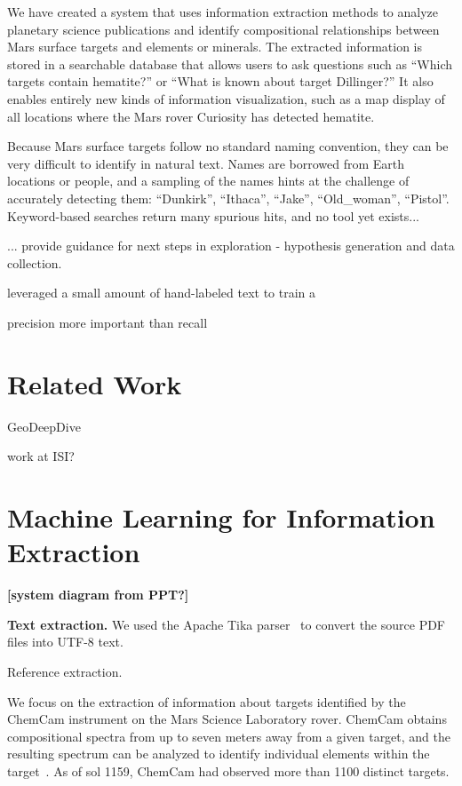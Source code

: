 \documentclass[letterpaper]{article} %
\begin{document}
We have created a system that uses information extraction methods to
analyze planetary science publications and identify compositional
relationships between Mars surface targets and elements or minerals.
The extracted information is stored in a searchable database that
allows users to ask questions such as ``Which targets contain
hematite?'' or ``What is known about target Dillinger?''  It also
enables entirely new kinds of information visualization, such as a map
display of all locations where the Mars rover Curiosity has detected
hematite. 

Because Mars surface targets follow no standard naming convention,
they can be very difficult to identify in natural text.  Names are
borrowed from Earth locations or people, and a sampling of the names
hints at the challenge of accurately detecting them: ``Dunkirk'',
``Ithaca'', ``Jake'',  ``Old\_woman'', ``Pistol''.  Keyword-based
searches return many spurious hits, and no tool yet exists...


... provide guidance for next steps in exploration 
- hypothesis generation and data collection.

leveraged a small amount of hand-labeled text to train a

precision more important than recall

\section{Related Work}

GeoDeepDive

work at ISI?

\section{Machine Learning for Information Extraction}

{\bf [system diagram from PPT?]}

{\bf Text extraction.}  We used the Apache Tika
parser~\cite{mattmann:tika11} to convert the source PDF files into
UTF-8 text.

Reference extraction.

We focus on the extraction of information about targets identified by
the ChemCam instrument on the Mars Science Laboratory rover.  ChemCam
obtains compositional spectra from up to seven meters away from a
given target, and the resulting spectrum can be analyzed to identify
individual elements within the target~\cite{maurice:chemcam12}.  As of
sol 1159, ChemCam had observed more than 1100 distinct targets.
\end{document}

